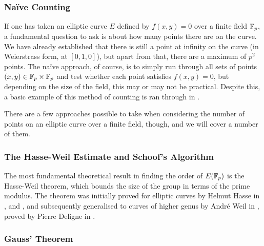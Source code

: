 \subsubsection{Naïve Counting}
If one has taken an elliptic curve $E$ defined by $f(x,y)=0$ over a finite field $\mathbb{F}_{p}$, a fundamental question to ask is about how many points there are on the curve.
We have already established that there is still a point at infinity on the curve (in Weierstrass form, at $[0,1,0]$), but apart from that, there are a maximum of $p^2$ points. %
The naïve approach, of course, is to simply run through all sets of points $(x,y) \in \mathbb{F}_{p} \times \mathbb{F}_{p}$ and test whether each point satisfies $f(x,y)=0$, but depending on the size of the field, this may or may not be practical.
Despite this, a basic example of this method of counting is ran through in .

There are a few approaches possible to take when considering the number of points on an elliptic curve over a finite field, though, and we will cover a number of them.
\subsubsection{The Hasse-Weil Estimate and Schoof's Algorithm}
\label{hasseweil}
The most fundamental theoretical result in finding the order of $E(\mathbb{F}_{p})$ is the Hasse-Weil theorem, which bounds the size of the group in terms of the prime modulus.
The theorem was initially proved for elliptic curves by Helmut Hasse in \cite{hasse1936a}, \cite{hasse1936b} and \cite{hasse1936c}, and subsequently generalised to curves of higher genus by André Weil in \cite{weil1948}, proved by Pierre Deligne in \cite{deligne1974}.

\subsubsection{Gauss' Theorem}

